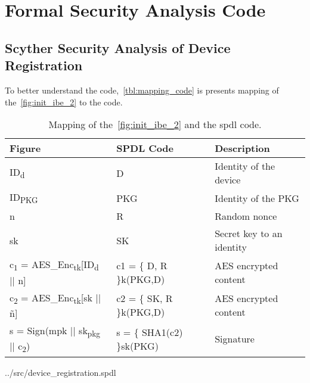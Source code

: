 \chapter{Formal Security Analysis Code}\label{apx:code}


\section{Scyther Security Analysis of Device Registration}\label{apx:scyther-analysis-dr}
To better understand the code,~\autoref{tbl:mapping_code} is presents mapping of the~\autoref{fig:init_ibe_2} to the code.

\begin{table}[h]
  \begin{tabular}{lll}
  Figure      				    & SPDL Code     			& Description 				       \\ \hline
  ID\textsubscript{d}  		& D   						    & Identity of the device 	   \\ %
  ID\textsubscript{PKG}   & PKG      					  & Identity of the PKG 		   \\ %
  n      					        & R            				& Random nonce 				       \\ %
  sk      					      & SK           				& Secret key to an identity	 \\ %
  c\textsubscript{1} = AES\_Enc\textsubscript{tk}[ID\textsubscript{d} || n]  & c1 = \{ D, R \}k(PKG,D)   & AES encrypted content		\\ %
  c\textsubscript{2} = AES\_Enc\textsubscript{tk}[sk || \~{n}]     	& c2 = \{ SK, R \}k(PKG,D)	& AES encrypted content 	\\ %
  s = Sign(mpk || sk\textsubscript{pkg} || c\textsubscript{2})      & s = \{ SHA1(c2) \}sk(PKG)   & Signature				\\ %
  \end{tabular}
  \caption[SPDL mapping device registration]{Mapping of the~\autoref{fig:init_ibe_2} and the \gls{spdl} code.}
  \label{tbl:mapping_code}
\end{table}

\begin{lstinputlisting}
[language=Python, caption={Device Registration SPDL}]{../src/device_registration.spdl}
\end{lstinputlisting}


